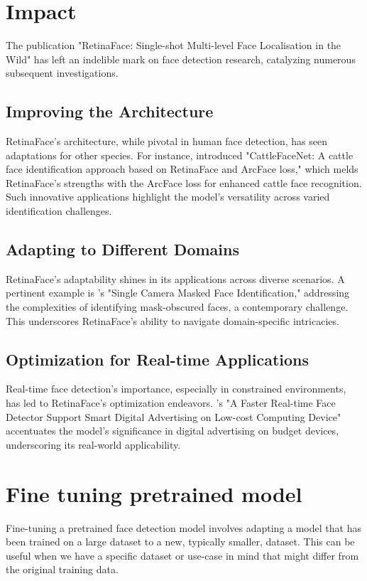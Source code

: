 \documentclass{article}
\begin{document}
\section{Impact}

The publication "RetinaFace: Single-shot Multi-level Face Localisation in the Wild" has left an indelible mark on face detection research, catalyzing numerous subsequent investigations.

\subsection{Improving the Architecture}
RetinaFace's architecture, while pivotal in human face detection, has seen adaptations for other species. For instance, \cite{xu2022cattlefacenet} introduced "CattleFaceNet: A cattle face identification approach based on RetinaFace and ArcFace loss," which melds RetinaFace's strengths with the ArcFace loss for enhanced cattle face recognition. Such innovative applications highlight the model's versatility across varied identification challenges.

\subsection{Adapting to Different Domains}
RetinaFace's adaptability shines in its applications across diverse scenarios. A pertinent example is \cite{aswal2020single}'s "Single Camera Masked Face Identification," addressing the complexities of identifying mask-obscured faces, a contemporary challenge. This underscores RetinaFace's ability to navigate domain-specific intricacies.

\subsection{Optimization for Real-time Applications}
Real-time face detection's importance, especially in constrained environments, has led to RetinaFace's optimization endeavors. \cite{putro2022faster}'s "A Faster Real-time Face Detector Support Smart Digital Advertising on Low-cost Computing Device" accentuates the model's significance in digital advertising on budget devices, underscoring its real-world applicability.

\section{Fine tuning pretrained model}

Fine-tuning a pretrained face detection model involves adapting a model that has been trained on a large dataset to a new, typically smaller, dataset. 
This can be useful when we have a specific dataset or use-case in mind that might differ from the original training data. 
\end{document}
